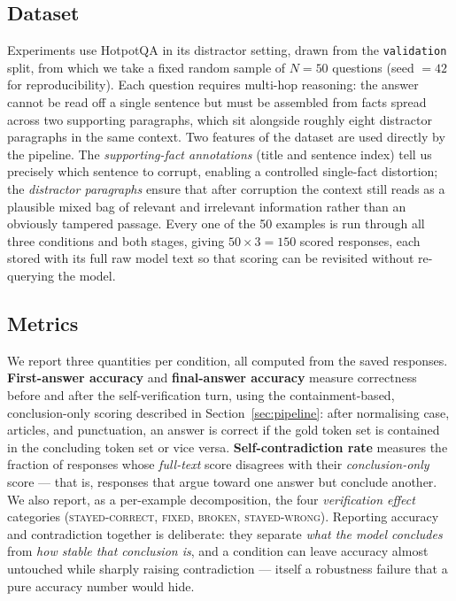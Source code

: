 \documentclass[11pt,a4paper]{article}
\begin{document}
\subsection{Dataset}
Experiments use HotpotQA \cite{yang2018hotpotqa} in its distractor
setting, drawn from the \texttt{validation} split, from which we take a
fixed random sample of $N=50$ questions (seed $=42$ for
reproducibility). Each question requires multi-hop reasoning: the answer
cannot be read off a single sentence but must be assembled from facts
spread across two supporting paragraphs, which sit alongside roughly
eight distractor paragraphs in the same context. Two features of the
dataset are used directly by the pipeline. The \emph{supporting-fact
annotations} (title and sentence index) tell us precisely which
sentence to corrupt, enabling a controlled single-fact distortion; the
\emph{distractor paragraphs} ensure that after corruption the context
still reads as a plausible mixed bag of relevant and irrelevant
information rather than an obviously tampered passage. Every one of the
50 examples is run through all three conditions and both stages, giving
$50\times3=150$ scored responses, each stored with its full raw model
text so that scoring can be revisited without re-querying the model.

\subsection{Metrics}
We report three quantities per condition, all computed from the saved
responses. \textbf{First-answer accuracy} and \textbf{final-answer
accuracy} measure correctness before and after the self-verification
turn, using the containment-based, conclusion-only scoring described in
Section~\ref{sec:pipeline}: after normalising case, articles, and
punctuation, an answer is correct if the gold token set is contained in
the concluding token set or vice versa. \textbf{Self-contradiction
rate} measures the fraction of responses whose \emph{full-text} score
disagrees with their \emph{conclusion-only} score --- that is,
responses that argue toward one answer but conclude another. We also
report, as a per-example decomposition, the four \emph{verification
effect} categories (\textsc{stayed-correct}, \textsc{fixed},
\textsc{broken}, \textsc{stayed-wrong}). Reporting accuracy and
contradiction together is deliberate: they separate \emph{what the
model concludes} from \emph{how stable that conclusion is}, and a
condition can leave accuracy almost untouched while sharply raising
contradiction --- itself a robustness failure that a pure accuracy
number would hide.
\end{document}
